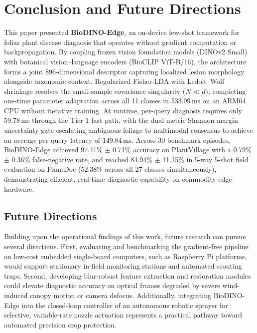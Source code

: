 \section{Conclusion and Future Directions}
\label{sec:conclusion}

This paper presented \textbf{BioDINO-Edge}, an on-device few-shot framework for foliar plant disease diagnosis that operates without gradient computation or backpropagation. By coupling frozen vision foundation models (DINOv2 Small) with botanical vision--language encoders (BioCLIP ViT-B/16), the architecture forms a joint 896-dimensional descriptor capturing localized lesion morphology alongside taxonomic context. Regularized Fisher-LDA with Ledoit--Wolf shrinkage resolves the small-sample covariance singularity ($N \ll d$), completing one-time parameter adaptation across all 11 classes in 533.99\,ms on an ARM64 CPU without iterative training. At runtime, per-query diagnosis requires only 59.78\,ms through the Tier-1 fast path, with the dual-metric Shannon-margin uncertainty gate escalating ambiguous foliage to multimodal consensus to achieve an average per-query latency of 149.84\,ms. Across 30 benchmark episodes, BioDINO-Edge achieved 97.41\% $\pm$ 0.71\% accuracy on PlantVillage with a 0.79\% $\pm$ 0.36\% false-negative rate, and reached 84.94\% $\pm$ 11.15\% in 5-way 5-shot field evaluation on PlantDoc (52.38\% across all 27 classes simultaneously), demonstrating efficient, real-time diagnostic capability on commodity edge hardware.

\subsection{Future Directions}
Building upon the operational findings of this work, future research can pursue several directions. First, evaluating and benchmarking the gradient-free pipeline on low-cost embedded single-board computers, such as Raspberry Pi platforms, would support stationary in-field monitoring stations and automated scouting traps. Second, developing blur-robust feature extraction and restoration modules could elevate diagnostic accuracy on optical frames degraded by severe wind-induced canopy motion or camera defocus. Additionally, integrating BioDINO-Edge into the closed-loop controller of an autonomous robotic sprayer for selective, variable-rate nozzle actuation represents a practical pathway toward automated precision crop protection.
